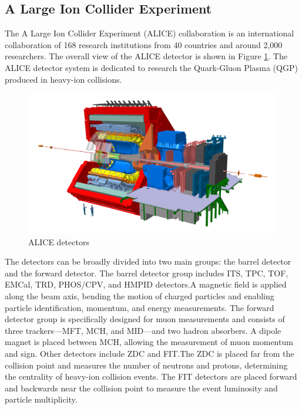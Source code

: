         \subsection{A Large Ion Collider Experiment}
        The A Large Ion Collider Experiment (ALICE) collaboration is an international collaboration of 168 research institutions from 40 countries and around 2,000 researchers. The overall view of the ALICE detector is shown in Figure \ref{ALICE_detectors}. The ALICE detector system is dedicated to research the Quark-Gluon Plasma (QGP) produced in heavy-ion collisions.
        \begin{figure}[htbp]
            \centering
            \includegraphics[keepaspectratio, scale=0.2]{fig/2_1_ALICE_RUN3_detectors.jpg}
            \caption{ALICE detectors}
            \label{ALICE_detectors}
        \end{figure}
        The detectors can be broadly divided into two main groups: the barrel detector and the forward detector.
        The barrel detector group includes ITS, TPC, TOF, EMCal, TRD, PHOS/CPV, and HMPID detectors.\@ A magnetic field is applied along the beam axis, bending the motion of charged particles and enabling particle identification, momentum, and energy measurements. The forward detector group is specifically designed for muon measurements and consists of three trackers—MFT, MCH, and MID—and two hadron absorbers. A dipole magnet is placed between MCH, allowing the measurement of muon momentum and sign. Other detectors include ZDC and FIT.\@ The ZDC is placed far from the collision point and measures the number of neutrons and protons, determining the centrality of heavy-ion collision events. The FIT detectors are placed forward and backwards near the collision point to measure the event luminosity and particle multiplicity.
